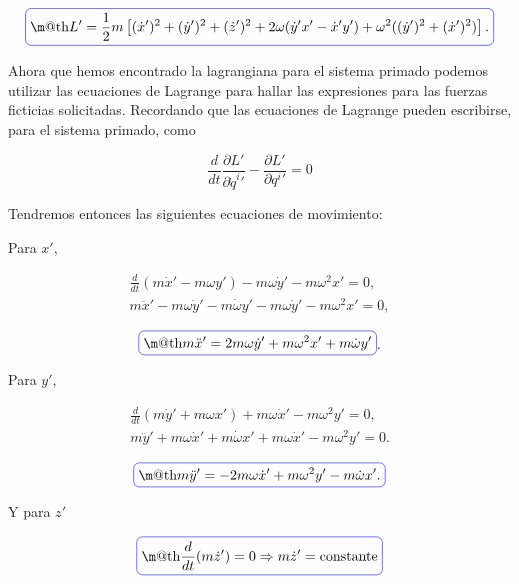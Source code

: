 \documentclass[a4paper,10pt]{article}
\makeatletter
\numberwithin{equation}{section}
\newcommand*{\boxcolor}{blue}
\renewcommand{\boxed}[1]{\textcolor{\boxcolor}{%
\tikz[baseline={([yshift=-1ex]current bounding box.center)}] \node [rectangle, minimum width=1ex,rounded corners,draw] {\normalcolor\m@th$\displaystyle#1$};}}
\makeatother
\begin{document}
\begin{equation}
 \boxed{L' = \frac{1}{2}m \left[ (\dot{x}')^2 + (\dot{y}')^2 + (\dot{z}')^2 + 2\omega(\dot{y}'x' - \dot{x}'y')
 + \omega^2((\dot{y}')^2 + (\dot{x}')^2)\right]. }
\end{equation}

Ahora que hemos encontrado la lagrangiana para el sistema primado podemos utilizar 
las ecuaciones de Lagrange para hallar las expresiones para las fuerzas ficticias 
solicitadas. Recordando que las ecuaciones de Lagrange pueden escribirse, para el 
sistema primado, como

\begin{equation}
 \frac{d}{dt}\frac{\partial L'}{\partial \dot{q}^{i}{'}} - \frac{\partial L'}{\partial q^{i}{'}} = 0
\end{equation}

Tendremos entonces las siguientes ecuaciones de movimiento:

\vspace{.3cm}

Para $x'$,

\begin{align*}
 \frac{d}{dt}(m\dot{x}' - m\omega y') - m\omega\dot{y}' - m\omega^2x' = 0, \\
 m\ddot{x}' - m\omega\dot{y}' - m\dot{\omega}y' - m\omega\dot{y}' - m\omega^2x' = 0,
\end{align*}

\begin{equation}
 \boxed{m\ddot{x}' = 2m\omega\dot{y}' + m\omega^2 x'+ m\dot{\omega}y'}.
 \label{eq:ecuMoviXNonInertial}
\end{equation}

Para $y'$,

\begin{align*}
 \frac{d}{dt}(m\dot{y}' + m\omega x') + m\omega \dot{x}' - m\omega^2y' = 0, \\
 m\ddot{y}' + m\omega\dot{x}' + m\dot{\omega}x' + m\omega \dot{x}' - m\omega^2y' = 0.
\end{align*}

\begin{equation}
 \boxed{m\ddot{y}' = -2m\omega\dot{x}' + m\omega^2 y' - m\dot{\omega}x'.}
  \label{eq:ecuMoviYNonInertial}
\end{equation}

Y para $z'$

\begin{equation}
 \boxed{\frac{d}{dt}(m\dot{z}') = 0 \Rightarrow m\dot{z}' = \text{constante}}
  \label{eq:ecuMoviZNonInertial}
\end{equation}
\end{document}
